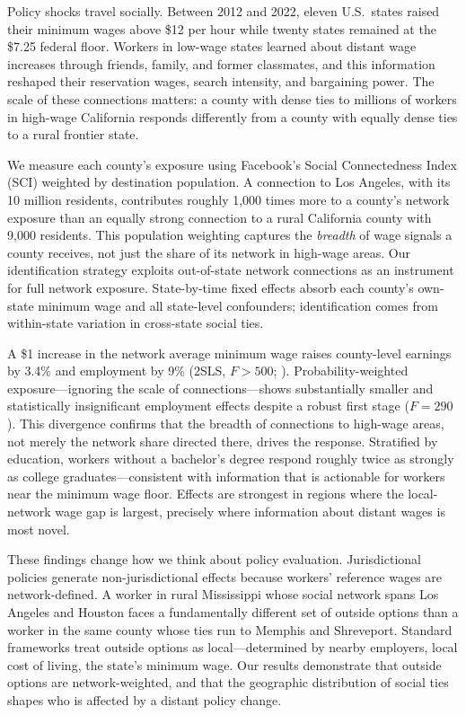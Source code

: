 \documentclass[12pt]{article}
\begin{document}
Policy shocks travel socially. Between 2012 and 2022, eleven U.S.\ states raised their minimum wages above \$12 per hour while twenty states remained at the \$7.25 federal floor. Workers in low-wage states learned about distant wage increases through friends, family, and former classmates, and this information reshaped their reservation wages, search intensity, and bargaining power. The scale of these connections matters: a county with dense ties to millions of workers in high-wage California responds differently from a county with equally dense ties to a rural frontier state.

We measure each county's exposure using Facebook's Social Connectedness Index (SCI) weighted by destination population. A connection to Los Angeles, with its 10 million residents, contributes roughly 1,000 times more to a county's network exposure than an equally strong connection to a rural California county with 9,000 residents. This population weighting captures the \textit{breadth} of wage signals a county receives, not just the share of its network in high-wage areas. Our identification strategy exploits out-of-state network connections as an instrument for full network exposure. State-by-time fixed effects absorb each county's own-state minimum wage and all state-level confounders; identification comes from within-state variation in cross-state social ties.

A \$1 increase in the network average minimum wage raises county-level earnings by 3.4\% and employment by 9\% (2SLS, $F > 500$; ). Probability-weighted exposure---ignoring the scale of connections---shows substantially smaller and statistically insignificant employment effects despite a robust first stage ($F = 290$). This divergence confirms that the breadth of connections to high-wage areas, not merely the network share directed there, drives the response. Stratified by education, workers without a bachelor's degree respond roughly twice as strongly as college graduates---consistent with information that is actionable for workers near the minimum wage floor. Effects are strongest in regions where the local-network wage gap is largest, precisely where information about distant wages is most novel.

These findings change how we think about policy evaluation. Jurisdictional policies generate non-jurisdictional effects because workers' reference wages are network-defined. A worker in rural Mississippi whose social network spans Los Angeles and Houston faces a fundamentally different set of outside options than a worker in the same county whose ties run to Memphis and Shreveport. Standard frameworks treat outside options as local---determined by nearby employers, local cost of living, the state's minimum wage. Our results demonstrate that outside options are network-weighted, and that the geographic distribution of social ties shapes who is affected by a distant policy change.
\end{document}
